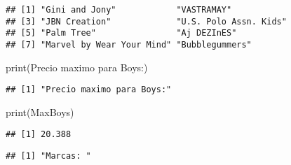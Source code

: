 \documentclass[
]{article}
\newenvironment{Shaded}{\begin{snugshade}}{\end{snugshade}}
\newcommand{\FunctionTok}[1]{\textcolor[rgb]{0.00,0.00,0.00}{#1}}
\newcommand{\NormalTok}[1]{#1}
\newcommand{\OtherTok}[1]{\textcolor[rgb]{0.56,0.35,0.01}{#1}}
\newcommand{\SpecialCharTok}[1]{\textcolor[rgb]{0.00,0.00,0.00}{#1}}
\newcommand{\StringTok}[1]{\textcolor[rgb]{0.31,0.60,0.02}{#1}}
\begin{document}
\begin{verbatim}
## [1] "Gini and Jony"            "VASTRAMAY"               
## [3] "JBN Creation"             "U.S. Polo Assn. Kids"    
## [5] "Palm Tree"                "Aj DEZInES"              
## [7] "Marvel by Wear Your Mind" "Bubblegummers"
\end{verbatim}

\begin{Shaded}
\begin{Highlighting}[]
\FunctionTok{print}\NormalTok{(}\StringTok{\textquotesingle{}Precio maximo para Boys:\textquotesingle{}}\NormalTok{)}
\end{Highlighting}
\end{Shaded}

\begin{verbatim}
## [1] "Precio maximo para Boys:"
\end{verbatim}

\begin{Shaded}
\begin{Highlighting}[]
\FunctionTok{print}\NormalTok{(MaxBoys)}
\end{Highlighting}
\end{Shaded}

\begin{verbatim}
## [1] 20.388
\end{verbatim}

\begin{Shaded}
\end{Shaded}

\begin{verbatim}
## [1] "Marcas: "
\end{verbatim}

\begin{Shaded}
\end{Shaded}
\end{document}
